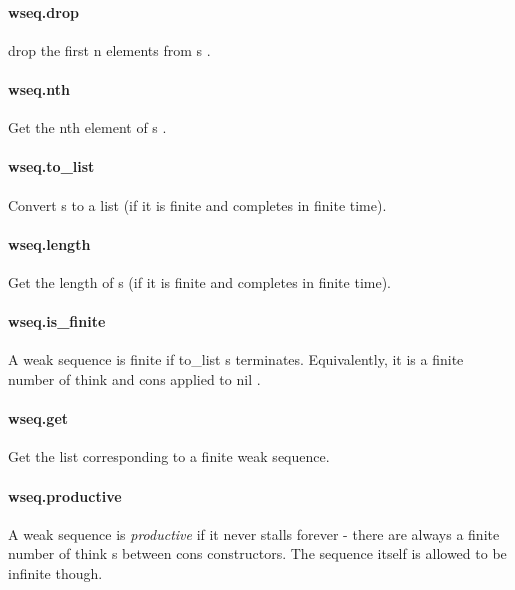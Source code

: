 \documentclass{article}
\begin{document}
\paragraph{wseq.drop}
\par
drop the first 
\colorbox[RGB]{253,246,227}{{{{\color[RGB]{101, 123, 131} n }}}} elements from 
\colorbox[RGB]{253,246,227}{{{{\color[RGB]{101, 123, 131} s }}}}.
\paragraph{wseq.nth}
\par
Get the nth element of 
\colorbox[RGB]{253,246,227}{{{{\color[RGB]{101, 123, 131} s }}}}.
\paragraph{wseq.to\_list}
\par
Convert 
\colorbox[RGB]{253,246,227}{{{{\color[RGB]{101, 123, 131} s }}}} to a list (if it is finite and completes in finite time).
\paragraph{wseq.length}
\par
Get the length of 
\colorbox[RGB]{253,246,227}{{{{\color[RGB]{101, 123, 131} s }}}} (if it is finite and completes in finite time).
\paragraph{wseq.is\_finite}
\par
A weak sequence is finite if 
\colorbox[RGB]{253,246,227}{{{{\color[RGB]{101, 123, 131} to\_list s }}}} terminates. Equivalently,
it is a finite number of 
\colorbox[RGB]{253,246,227}{{{{\color[RGB]{101, 123, 131} think }}}} and 
\colorbox[RGB]{253,246,227}{{{{\color[RGB]{101, 123, 131} cons }}}} applied to 
\colorbox[RGB]{253,246,227}{{{{\color[RGB]{101, 123, 131} nil }}}}.
\paragraph{wseq.get}
\par
Get the list corresponding to a finite weak sequence.
\paragraph{wseq.productive}
\par
A weak sequence is 
\emph{productive
} if it never stalls forever - there are
always a finite number of 
\colorbox[RGB]{253,246,227}{{{{\color[RGB]{101, 123, 131} think }}}}s between 
\colorbox[RGB]{253,246,227}{{{{\color[RGB]{101, 123, 131} cons }}}} constructors.
The sequence itself is allowed to be infinite though.
\end{document}
